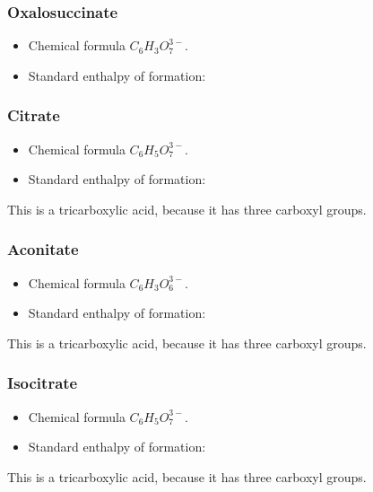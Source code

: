\documentclass{article}
\begin{document}
\subsubsection{Oxalosuccinate}
\begin{itemize}
    \item Chemical formula $C_6H_3O_7^{3-}$.
    \item Standard enthalpy of formation:
\end{itemize}

\subsubsection{Citrate}
\begin{itemize}
    \item Chemical formula $C_6H_5O_7^{3-}$.
    \item Standard enthalpy of formation:
\end{itemize}
This is a tricarboxylic acid, because it has three carboxyl groups.

\subsubsection{Aconitate}
\begin{itemize}
    \item Chemical formula $C_6H_3O_6^{3-}$.
    \item Standard enthalpy of formation:
\end{itemize}
This is a tricarboxylic acid, because it has three carboxyl groups.

\subsubsection{Isocitrate}
\begin{itemize}
    \item Chemical formula $C_6H_5O_7^{3-}$.
    \item Standard enthalpy of formation:
\end{itemize}
This is a tricarboxylic acid, because it has three carboxyl groups.
\end{document}
